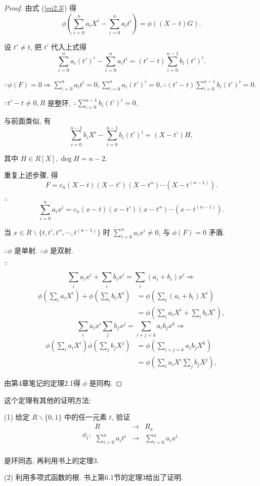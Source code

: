 \documentclass[UTF8]{ctexart}
\begin{document}
\begin{proof}
    由式 (\ref{eq2.3}) 得
    \[\phi\left(\sum\limits_{i=0}^{n}a_iX^i-\sum\limits_{i=0}^{n}a_it^i\right)=\phi\left((X-t)G\right).\]

    设 $t'\neq t$, 把 $t'$ 代入上式得
    \[\sum\limits_{i=0}^{n}a_i(t')^i-\sum\limits_{i=0}^{n}a_it^i=(t'-t)\sum\limits_{i=0}^{n-1}b_i(t')^i.\]

    $\because\phi(F)=0\Rightarrow\sum\limits_{i=0}^{n}a_it^i=0,\sum\limits_{i=0}^{n}a_i(t')^i=0,\therefore(t'-t)\sum\limits_{i=0}^{n-1}b_i(t')^i=0$.

    $\because t'-t\neq0,R$ 是整环, $\therefore\sum\limits_{i=0}^{n-1}b_i(t')^i=0$.

    与前面类似, 有
    \[\sum\limits_{i=0}^{n-1}b_iX^i-\sum\limits_{i=0}^{n-1}b_i(t')^i=(X-t')H,\]

    其中 $H\in R[X],\deg H=n-2$.

    重复上述步骤, 得
    \[F=c_n(X-t)(X-t')(X-t'')\cdots(X-t^{(n-1)}).\]

    $\therefore$
    \[\sum\limits_{i=0}^{n}a_ix^i=c_n(x-t)(x-t')(x-t'')\cdots(x-t^{(n-1)}).\]

    当 $x\in R\backslash\{t,t',t'',\cdots,t^{(n-1)}\}$ 时 $\sum\limits_{i=0}^{n}a_ix^i\neq0$, 与 $\phi(F)=0$ 矛盾.

    $\therefore\phi$ 是单射. $\therefore\phi$ 是双射.

    $\because$

    \[\sum\limits_ia_ix^i+\sum\limits_ib_ix^i=\sum\limits_i(a_i+b_i)x^i\Rightarrow\]
    \begin{align*}
        \phi\left(\sum\limits_ia_iX^i\right)+\phi\left(\sum\limits_ib_iX^i\right) & =\phi\left(\sum\limits_i(a_i+b_i)X^i\right) \\
        & =\phi\left(\sum\limits_ia_iX^i+\sum\limits_ib_iX^i\right),
    \end{align*}
    \[\sum\limits_ia_ix^i\sum\limits_jb_jx^j=\sum\limits_{i+j=k}a_ib_jx^k\Rightarrow\]
    \begin{align*}
        \phi\left(\sum\limits_ia_iX^i\right)\phi\left(\sum\limits_jb_jX^j\right) & =\phi\left(\sum\limits_{i+j=k}a_ib_jX^k\right) \\
        & =\phi\left(\sum\limits_ia_iX^i\sum\limits_jb_jX^j\right),
    \end{align*}

    由第4章笔记的定理2.1得 $\phi$ 是同构.
\end{proof}
\begin{note}
    这个定理有其他的证明方法:

    (1) 给定 $R\backslash\{0,1\}$ 中的任一元素 $t$, 验证
    \[\phi_t:\begin{array}{rcl}
        R & \to & R_x \\
        \sum\limits_{i=0}^{n}a_it^i & \to & \sum\limits_{i=0}^{n}a_ix^i \\
    \end{array}\]

    是环同态, 再利用书上的定理3.

    (2) 利用多项式函数的根. 书上第6.1节的定理3给出了证明.
\end{note}
\end{document}
